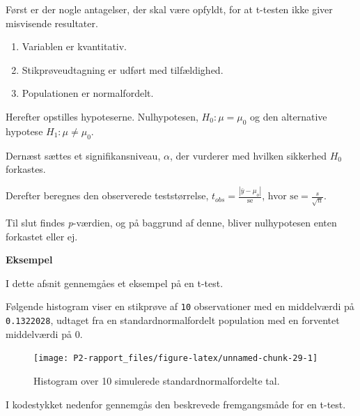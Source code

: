 \documentclass[
]{book}
\providecommand{\tightlist}{%
  \setlength{\itemsep}{0pt}\setlength{\parskip}{0pt}}
\theoremstyle{definition}
\theoremstyle{definition}
\theoremstyle{definition}
\theoremstyle{remark}
\begin{document}
Først er der nogle antagelser, der skal være opfyldt, for at t-testen ikke giver misvisende resultater.

\begin{enumerate}
\def\labelenumi{\arabic{enumi}.}
\tightlist
\item
  Variablen er kvantitativ.
\item
  Stikprøveudtagning er udført med tilfældighed.
\item
  Populationen er normalfordelt.
\end{enumerate}

Herefter opstilles hypoteserne. Nulhypotesen, \(H_0: \mu = \mu_0\) og den alternative hypotese \(H_1: \mu \neq \mu_0\).

Dernæst sættes et signifikansniveau, \(\alpha\), der vurderer med hvilken sikkerhed \(H_0\) forkastes.

Derefter beregnes den observerede teststørrelse, \(t_{obs} = \frac{|\bar y - \mu_o|}{\text{se}}\), hvor \(\text{se} = \frac{s}{\sqrt{n}}\).

Til slut findes \emph{p}-værdien, og på baggrund af denne, bliver nulhypotesen enten forkastet eller ej.

\textbf{Eksempel}

I dette afsnit gennemgåes et eksempel på en t-test.

Følgende histogram viser en stikprøve af \texttt{10} observationer med en middelværdi på \texttt{0.1322028}, udtaget fra en standardnormalfordelt population med en forventet middelværdi på \(0\).

\begin{figure}

{\centering \texttt{[image: P2-rapport\_files/figure-latex/unnamed-chunk-29-1]} 

}

\caption{Histogram over 10 simulerede standardnormalfordelte tal.}\label{fig:unnamed-chunk-29}
\end{figure}

I kodestykket nedenfor gennemgås den beskrevede fremgangsmåde for en t-test.
\end{document}
